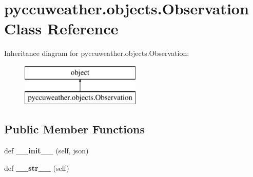 \hypertarget{classpyccuweather_1_1objects_1_1_observation}{}\section{pyccuweather.\+objects.\+Observation Class Reference}
\label{classpyccuweather_1_1objects_1_1_observation}
Inheritance diagram for pyccuweather.\+objects.\+Observation\+:\begin{figure}[H]
\begin{center}
\leavevmode
\includegraphics[height=2.000000cm]{classpyccuweather_1_1objects_1_1_observation}
\end{center}
\end{figure}
\subsection*{Public Member Functions}
\begin{DoxyCompactItemize}
\item 
\hypertarget{classpyccuweather_1_1objects_1_1_observation_a319e70e2c445a5109fb3709768263dfa}{}def {\bfseries \+\_\+\+\_\+init\+\_\+\+\_\+} (self, json)\label{classpyccuweather_1_1objects_1_1_observation_a319e70e2c445a5109fb3709768263dfa}

\item 
\hypertarget{classpyccuweather_1_1objects_1_1_observation_ab9fb3d1f9a1812c3a0f7cd063f72015c}{}def {\bfseries \+\_\+\+\_\+str\+\_\+\+\_\+} (self)\label{classpyccuweather_1_1objects_1_1_observation_ab9fb3d1f9a1812c3a0f7cd063f72015c}

\end{DoxyCompactItemize}
